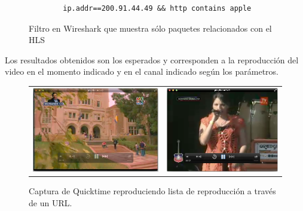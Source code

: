 \begin{figure}[H]
	\centering
\begin{lstlisting}
		ip.addr==200.91.44.49 && http contains apple
\end{lstlisting}
\caption{Filtro en Wireshark que muestra sólo paquetes relacionados con el HLS}
\end{figure}


Los resultados obtenidos son los esperados y corresponden a la reproducción del video en el momento indicado y en el canal indicado según los parámetros.

\begin{figure}[H]
	\centering
	\begin{tabular}{cc}
	\includegraphics[scale=0.3]{imgs/qt-mega.png} & 
	\includegraphics[scale=0.3]{imgs/qt-tvn.png} \\
	\end{tabular}
	\caption{Captura de Quicktime reproduciendo lista de reproducción a través de un URL.}
	\label{qt-tvn-mega}
\end{figure}

